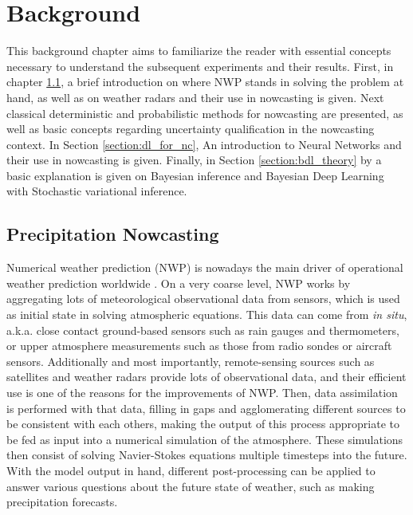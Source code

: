\chapter{Background}
\label{chapter:background} 

This background chapter aims to familiarize the reader with essential concepts necessary to understand the subsequent experiments and their results. First, in chapter \ref{section:precip_nc}, a brief introduction on where NWP stands in solving the problem at hand, as well as on weather radars and their use in nowcasting is given. Next classical deterministic and probabilistic methods for nowcasting are presented, as well as basic concepts regarding uncertainty qualification in the nowcasting context. In Section \ref{section:dl_for_nc}, An introduction to Neural Networks and their use in nowcasting is given. Finally, in Section \ref{section:bdl_theory} by a basic explanation is given on Bayesian inference and Bayesian Deep Learning with Stochastic variational inference. 

\section{Precipitation Nowcasting}
\label{section:precip_nc}


Numerical weather prediction (NWP) is nowadays the main driver of operational weather prediction worldwide \cite{schultz_can_2021, bauer_quiet_2015}. On a very coarse level, NWP works by aggregating lots of meteorological observational data from sensors, which is used as initial state in solving atmospheric equations. This data can come from \textit{in situ}, a.k.a. close contact ground-based sensors such as rain gauges and thermometers, or upper atmosphere measurements such as those from radio sondes or aircraft sensors. Additionally and most importantly, remote-sensing sources such as satellites and weather radars provide lots of observational data, and their efficient use is one of the reasons for the improvements of NWP. Then, data assimilation is performed with that data, filling in gaps and agglomerating different sources to be consistent with each others, making the output of this process appropriate to be fed as input into a numerical simulation of the atmosphere. These simulations then consist of solving Navier-Stokes equations multiple timesteps into the future. With the model output in hand, different post-processing can be applied to answer various questions about the future state of weather, such as making precipitation forecasts.

